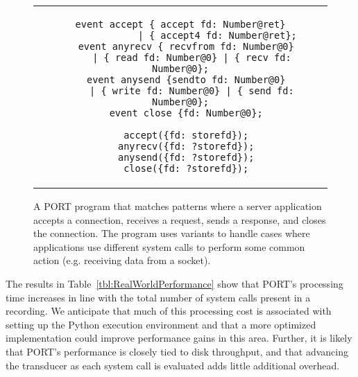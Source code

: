 \begin{figure}
\centering
\begin{tabular}{c}
\begin{lstlisting}[gobble=2]
  event accept { accept fd: Number@ret}
             | { accept4 fd: Number@ret};
  event anyrecv { recvfrom fd: Number@0}
    | { read fd: Number@0} | { recv fd: Number@0};
  event anysend {sendto fd: Number@0}
    | { write fd: Number@0} | { send fd: Number@0};
  event close {fd: Number@0};

  accept({fd: storefd});
  anyrecv({fd: ?storefd});
  anysend({fd: ?storefd});
  close({fd: ?storefd});
\end{lstlisting}
\end{tabular}
\caption{A PORT program that matches patterns where a server application
  accepts a connection, receives a request, sends a response, and closes
  the connection.  The program uses variants to handle cases where
  applications use different system calls to perform some common action
  (e.g. receiving data from a socket).}
\label{lst:RealWorldPerformance}
\end{figure}

The results in Table~\ref{tbl:RealWorldPerformance} show that
PORT's
processing time increases in line with the total number of system calls
present in a recording.  We anticipate that much of this processing cost is
associated with setting up the Python execution environment and that a more
optimized implementation could improve performance gains in this area.
Further,
it is likely that PORT's performance is closely tied to
disk throughput,
and that advancing the transducer
as each system call is evaluated
adds little additional overhead.

